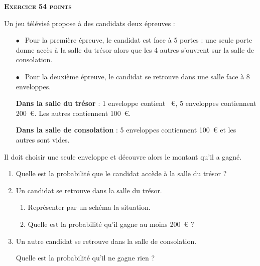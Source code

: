 \textbf{\textsc{Exercice 5\hfill 4 points}}

\medskip

Un jeu télévisé propose à des candidats deux épreuves :

\setlength\parindent{6mm}
\begin{itemize}
\item[$\bullet~~$]Pour la première épreuve, le candidat est face à 5 portes : une seule
porte donne accès à la salle du trésor alors que les 4 autres s'ouvrent
sur la salle de consolation.
\item[$\bullet~~$]Pour la deuxième épreuve, le candidat se retrouve dans une salle face
à 8 enveloppes.

\textbf{Dans la salle du trésor }: 1 enveloppe contient ~\euro, 5 enveloppes
contiennent 200~\euro. Les autres contiennent 100~\euro.

\textbf{Dans la salle de consolation} : 5 enveloppes contiennent 100~\euro{} et les
autres sont vides.
\end{itemize}
\setlength\parindent{0mm}

Il doit choisir une seule enveloppe et découvre alors le montant qu'il a gagné.

\medskip

\begin{enumerate}
\item Quelle est la probabilité que le candidat accède à la salle du trésor ?
\item Un candidat se retrouve dans la salle du trésor.
	\begin{enumerate}
		\item Représenter par un schéma la situation.
		\item Quelle est la probabilité qu'il gagne au moins 200~\euro{} ?
	\end{enumerate}
\item Un autre candidat se retrouve dans la salle de consolation.

Quelle est la probabilité qu'il ne gagne rien ?
\end{enumerate}

\vspace{0.5cm}

